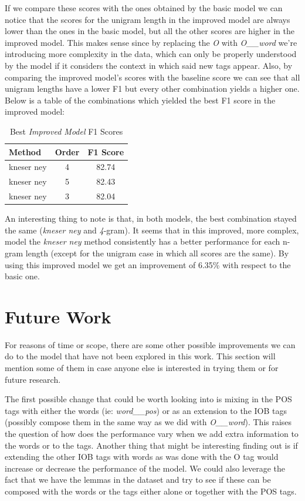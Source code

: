 \documentclass[11pt,a4paper]{article}
\begin{document}
	If we compare these scores with the ones obtained by the basic model we can notice that the scores for the unigram length in the improved model are always lower than the ones in the basic model, but all the other scores are higher in the improved model. This makes sense since by replacing the \textit{O} with \textit{O\_\_word} we're introducing more complexity in the data, which can only be properly understood by the model if it considers the context in which said new tags appear. Also, by comparing the improved model's scores with the baseline score we can see that all unigram lengths have a lower F1 but every other combination yields a higher one. Below is a table of the combinations which yielded the best F1 score in the improved model:
	
	\begin{table}[h]
		\centering
		\begin{tabularx}{155pt}{l | c | c}

			\textbf{Method} & \textbf{Order} & \textbf{F1 Score} \\
			\hline 
			kneser ney & 4 & 82.74 \\
			\hline
			kneser ney & 5 & 82.43 \\
			kneser ney & 3 & 82.04 \\

		\end{tabularx} 
		\caption{Best \textit{Improved Model} F1 Scores}
		\label{table:improved-method-scores}	
	\end{table}	
			
	An interesting thing to note is that, in both models, the best combination stayed the same (\textit{kneser ney} and \textit{4}-gram). It seems that in this improved, more complex, model the \textit{kneser ney} method consistently has a better performance for each n-gram length (except for the unigram case in which all scores are the same). By using this improved model we get an improvement of 6.35\% with respect to the basic one.

\section{Future Work}

	For reasons of time or scope, there are some other possible improvements we can do to the model that have not been explored in this work. This section will mention some of them in case anyone else is interested in trying them or for future research.
	
	The first possible change that could be worth looking into is mixing in the POS tags with either the words (ie: \textit{word\_\_pos}) or as an extension to the IOB tags (possibly compose them in the same way as we did with \textit{O\_\_word}). This raises the question of how does the performance vary when we add extra information to the words or to the tags. Another thing that might be interesting finding out is if extending the other IOB tags with words as was done with the O tag would increase or decrease the performance of the model. We could also leverage the fact that we have the lemmas in the dataset and try to see if these can be composed with the words or the tags either alone or together with the POS tags.
	
\end{document}
